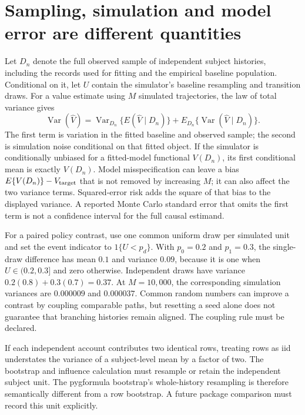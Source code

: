 \section{Sampling, simulation and model error are different quantities}
\label{exec17:s5-uncertainty}

Let $D_n$ denote the full observed sample of independent subject histories,
including the records used for fitting and the empirical baseline population.
Conditional on it, let $U$ contain the simulator's baseline resampling and
transition draws. For a value estimate using $M$ simulated trajectories,
the law of total variance gives
\begin{equation}
 \operatorname{Var}(\widehat V)=
 \operatorname{Var}_{D_n}\{E(\widehat V\mid D_n)\}+
 E_{D_n}\{\operatorname{Var}(\widehat V\mid D_n)\}.
 \label{exec17:s5-total-variance}
\end{equation}
The first term is variation in the fitted baseline and observed sample; the
second is simulation noise conditional on that fitted object. If the simulator
is conditionally unbiased for a fitted-model functional $V(D_n)$, its first
conditional mean is exactly $V(D_n)$. Model misspecification can leave a
bias $E\{V(D_n)\}-V_{\rm target}$ that is not removed by increasing $M$; it
can also affect the two variance terms. Squared-error risk adds the square
of that bias to the displayed variance. A
reported Monte Carlo standard error that omits the first term is not a
confidence interval for the full causal estimand.

For a paired policy contrast, use one common uniform draw per simulated unit
and set the event indicator to $1\{U<p_d\}$. With $p_0=0.2$ and $p_1=0.3$, the
single-draw difference has mean $0.1$ and variance $0.09$, because it is one
when $U\in(0.2,0.3]$ and zero otherwise. Independent draws have variance
$0.2(0.8)+0.3(0.7)=0.37$. At $M=10{,}000$, the corresponding simulation
variances are $0.000009$ and $0.000037$. Common random numbers can improve a
contrast by coupling comparable paths, but resetting a seed alone does not
guarantee that branching histories remain aligned. The coupling rule must be
declared.

If each independent account contributes two identical rows, treating rows as
iid understates the variance of a subject-level mean by a factor of two. The
bootstrap and influence calculation must resample or retain the independent
subject unit. The pygformula bootstrap's whole-history resampling is therefore
semantically different from a row bootstrap. A future package comparison must
record this unit explicitly.~\citep{v131_sw_pygformula,exec17_s5_math}

